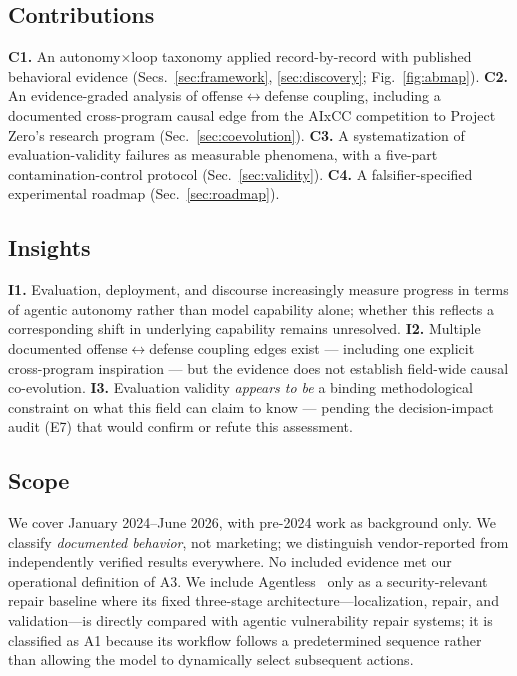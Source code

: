 \documentclass[conference,compsoc]{IEEEtran}
\begin{document}
\subsection{Contributions}
\textbf{C1.} An autonomy$\times$loop taxonomy applied record-by-record with published
behavioral evidence (Secs.~\ref{sec:framework}, \ref{sec:discovery}; Fig.~\ref{fig:abmap}).
\textbf{C2.} An evidence-graded analysis of offense$\leftrightarrow$defense coupling, including
a documented cross-program causal edge from the AIxCC competition to Project Zero's research
program (Sec.~\ref{sec:coevolution}). \textbf{C3.} A systematization of evaluation-validity
failures as measurable phenomena, with a five-part contamination-control protocol
(Sec.~\ref{sec:validity}). \textbf{C4.} A falsifier-specified experimental roadmap
(Sec.~\ref{sec:roadmap}).

\subsection{Insights}
\textbf{I1.} Evaluation, deployment, and discourse increasingly measure progress in terms of
agentic autonomy rather than model capability alone; whether this reflects a corresponding
shift in underlying capability remains unresolved. \textbf{I2.} Multiple documented
offense$\leftrightarrow$defense coupling edges exist --- including one explicit cross-program
inspiration --- but the evidence does not establish field-wide causal co-evolution.
\textbf{I3.} Evaluation validity \emph{appears to be} a binding methodological constraint on what this field can
claim to know --- pending the decision-impact audit (E7) that would confirm or refute this assessment.

\subsection{Scope}
We cover January 2024--June 2026, with pre-2024 work as background only. We classify
\emph{documented behavior}, not marketing; we distinguish vendor-reported from independently
verified results everywhere. No included evidence met our operational definition of A3. We include
Agentless~\cite{agentless2024} only as a security-relevant repair baseline where its fixed
three-stage architecture---localization, repair, and validation---is directly compared with
agentic vulnerability repair systems; it is classified as A1 because its workflow follows a
predetermined sequence rather than allowing the model to dynamically select subsequent actions.
\end{document}
